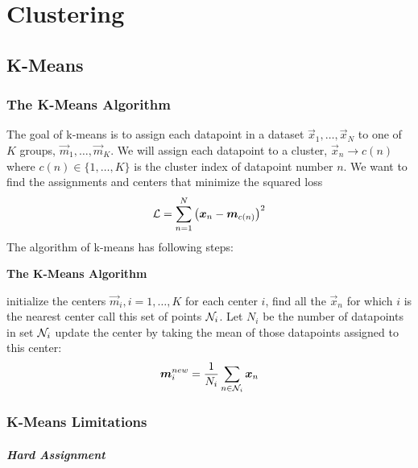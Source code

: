 
\chapter{Clustering}
\label{chapter11}



\section{K-Means}
\label{section11.1}

\subsection{The K-Means Algorithm}

The goal of k-means is to assign each datapoint in a dataset $\vec{x}_1,\dotsc,\vec{x}_N$ to one of $K$ groups, $\vec{m}_1,\dotsc,\vec{m}_K$. We will assign each datapoint to a cluster, $\vec{x}_n\to c(n)$ where $c(n)\in\{1,\dotsc,K\}$ is the cluster index of datapoint number $n$. We want to find the assignments and centers that minimize the squared loss
\begin{align*}
	\mathcal{L}=\sum_{n=1}^N\left(\boldsymbol{x}_n-\boldsymbol{m}_{c(n)}\right)^2
\end{align*}
The algorithm of k-means has following steps:
\begin{algorithm}[H]
	\caption*{\bf The K-Means Algorithm}
	\begin{algorithmic}
		\State initialize the centers $\vec{m}_i,i=1,\dotsc,K$
		\State for each center $i$, find all the $\vec{x}_n$ for which $i$ is the nearest center
		\State call this set of points $\mathcal{N}_i$. Let $N_i$ be the number of datapoints in set $\mathcal{N}_i$
		\State update the center by taking the mean of those datapoints assigned to this center:
		\begin{align*}
			\boldsymbol{m}_i^{new}=\frac{1}{N_i}\sum_{n\in\mathcal{N}_i}\boldsymbol{x}_n
		\end{align*}
		\EndWhile
	\end{algorithmic}
\end{algorithm}

\subsection{K-Means Limitations}

\paragraph{Hard Assignment}

